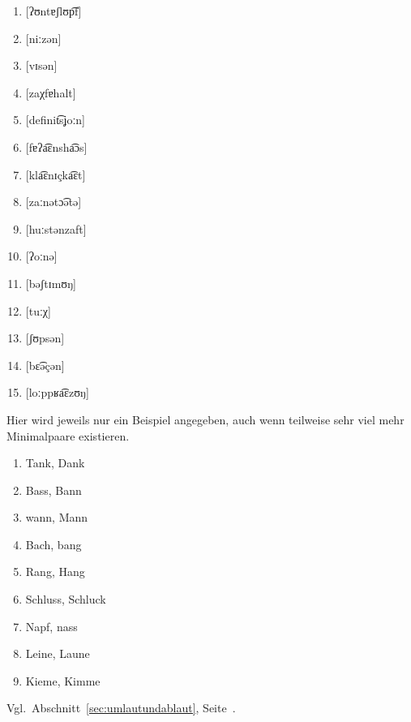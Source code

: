 \label{sol:phonetik03}

\begin{enumerate}
  \item{[ʔʊntɐʃlʊp͡f]}
  \item{[niːzən]}
  \item{[vɪsən]}
  \item{[zaχfɐhalt]}
  \item{[definit͡sʝoːn]}
  \item{[fɐʔa͡ɛnsha͡ɔs]}
  \item{[kla͡ɛnɪçka͡ɛt]}
  \item{[zaːnətɔ͡ətə]}
  \item{[huːstənzaft]}
  \item{[ʔoːnə]}
  \item{[bəʃtɪmʊŋ]}
  \item{[tuːχ]}
  \item{[ʃʊpsən]}
  \item{[bɛ͡əçən]}
  \item{[loːppʁa͡ɛzʊŋ]}
\end{enumerate}


\label{sol:phonologie01}

Hier wird jeweils nur ein Beispiel angegeben, auch wenn teilweise sehr viel mehr Minimalpaare existieren.

\begin{enumerate}
  \item Tank, Dank
  \item Bass, Bann
  \item wann, Mann
  \item Bach, bang
  \item Rang, Hang
  \item Schluss, Schluck
  \item Napf, nass
  \item Leine, Laune
  \item Kieme, Kimme
\end{enumerate}

\label{sol:phonologie02}

Vgl.\ Abschnitt~\ref{sec:umlautundablaut}, Seite~\pageref{sec:umlautundablaut}.

\label{sol:phonologie03}

